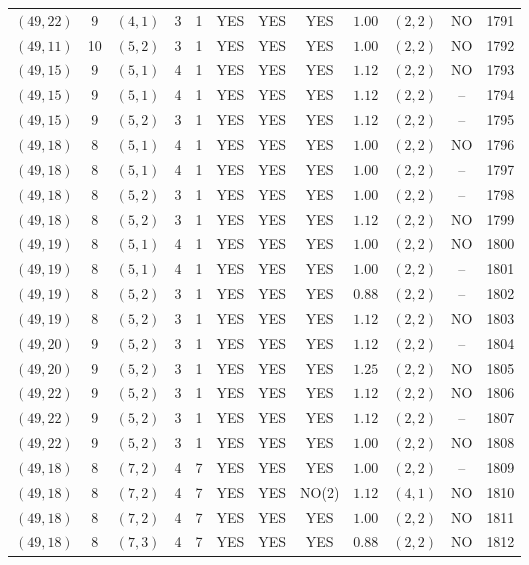 \begin{longtable}{|c|c|c|c|c|c|c|c|c|c|c|c|}
$(49,22)$ & 9 & $(4,1)$ & 3 & 1 & YES & YES & YES & $1.00$ & $(2,2)$ & NO & 1791\\
$(49,11)$ & 10 & $(5,2)$ & 3 & 1 & YES & YES & YES & $1.00$ & $(2,2)$ & NO & 1792\\
$(49,15)$ & 9 & $(5,1)$ & 4 & 1 & YES & YES & YES & $1.12$ & $(2,2)$ & NO & 1793\\
$(49,15)$ & 9 & $(5,1)$ & 4 & 1 & YES & YES & YES & $1.12$ & $(2,2)$ & -- & 1794\\
$(49,15)$ & 9 & $(5,2)$ & 3 & 1 & YES & YES & YES & $1.12$ & $(2,2)$ & -- & 1795\\
$(49,18)$ & 8 & $(5,1)$ & 4 & 1 & YES & YES & YES & $1.00$ & $(2,2)$ & NO & 1796\\
$(49,18)$ & 8 & $(5,1)$ & 4 & 1 & YES & YES & YES & $1.00$ & $(2,2)$ & -- & 1797\\
$(49,18)$ & 8 & $(5,2)$ & 3 & 1 & YES & YES & YES & $1.00$ & $(2,2)$ & -- & 1798\\
$(49,18)$ & 8 & $(5,2)$ & 3 & 1 & YES & YES & YES & $1.12$ & $(2,2)$ & NO & 1799\\
$(49,19)$ & 8 & $(5,1)$ & 4 & 1 & YES & YES & YES & $1.00$ & $(2,2)$ & NO & 1800\\
$(49,19)$ & 8 & $(5,1)$ & 4 & 1 & YES & YES & YES & $1.00$ & $(2,2)$ & -- & 1801\\
$(49,19)$ & 8 & $(5,2)$ & 3 & 1 & YES & YES & YES & $0.88$ & $(2,2)$ & -- & 1802\\
$(49,19)$ & 8 & $(5,2)$ & 3 & 1 & YES & YES & YES & $1.12$ & $(2,2)$ & NO & 1803\\
$(49,20)$ & 9 & $(5,2)$ & 3 & 1 & YES & YES & YES & $1.12$ & $(2,2)$ & -- & 1804\\
$(49,20)$ & 9 & $(5,2)$ & 3 & 1 & YES & YES & YES & $1.25$ & $(2,2)$ & NO & 1805\\
$(49,22)$ & 9 & $(5,2)$ & 3 & 1 & YES & YES & YES & $1.12$ & $(2,2)$ & NO & 1806\\
$(49,22)$ & 9 & $(5,2)$ & 3 & 1 & YES & YES & YES & $1.12$ & $(2,2)$ & -- & 1807\\
$(49,22)$ & 9 & $(5,2)$ & 3 & 1 & YES & YES & YES & $1.00$ & $(2,2)$ & NO & 1808\\
$(49,18)$ & 8 & $(7,2)$ & 4 & 7 & YES & YES & YES & $1.00$ & $(2,2)$ & -- & 1809\\
$(49,18)$ & 8 & $(7,2)$ & 4 & 7 & YES & YES & NO(2) & $1.12$ & $(4,1)$ & NO & 1810\\
$(49,18)$ & 8 & $(7,2)$ & 4 & 7 & YES & YES & YES & $1.00$ & $(2,2)$ & NO & 1811\\
$(49,18)$ & 8 & $(7,3)$ & 4 & 7 & YES & YES & YES & $0.88$ & $(2,2)$ & NO & 1812\\

\end{longtable}
